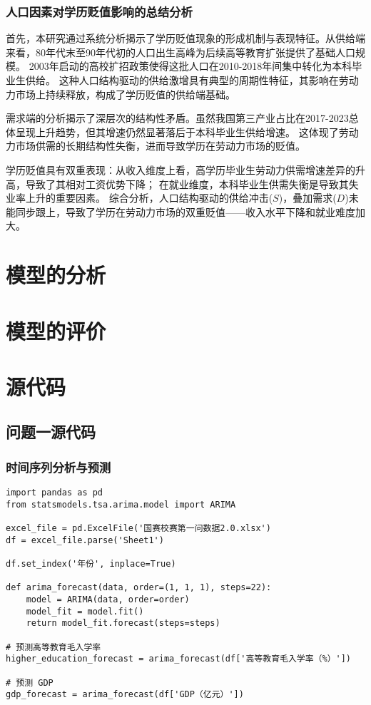 \documentclass[withoutpreface,bwprint]{cumcmthesis} %
\begin{document}
\subsubsection{人口因素对学历贬值影响的总结分析}

首先，本研究通过系统分析揭示了学历贬值现象的形成机制与表现特征。从供给端来看，80年代末至90年代初的人口出生高峰为后续高等教育扩张提供了基础人口规模。
2003年启动的高校扩招政策使得这批人口在2010-2018年间集中转化为本科毕业生供给。
这种人口结构驱动的供给激增具有典型的周期性特征，其影响在劳动力市场上持续释放，构成了学历贬值的供给端基础。

需求端的分析揭示了深层次的结构性矛盾。虽然我国第三产业占比在2017-2023总体呈现上升趋势，但其增速仍然显著落后于本科毕业生供给增速。
这体现了劳动力市场供需的长期结构性失衡，进而导致学历在劳动力市场的贬值。

学历贬值具有双重表现：从收入维度上看，高学历毕业生劳动力供需增速差异的升高，导致了其相对工资优势下降；
在就业维度，本科毕业生供需失衡是导致其失业率上升的重要因素。
综合分析，人口结构驱动的供给冲击($S$)，叠加需求($D$)未能同步跟上，导致了学历在劳动力市场的双重贬值——收入水平下降和就业难度加大。

\section{模型的分析}

\section{模型的评价}




\newpage
\appendix
\section{源代码}

\subsection{问题一源代码}

\subsubsection{时间序列分析与预测}

\begin{verbatim}
import pandas as pd
from statsmodels.tsa.arima.model import ARIMA

excel_file = pd.ExcelFile('国赛校赛第一问数据2.0.xlsx')
df = excel_file.parse('Sheet1')

df.set_index('年份', inplace=True)

def arima_forecast(data, order=(1, 1, 1), steps=22):
    model = ARIMA(data, order=order)
    model_fit = model.fit()
    return model_fit.forecast(steps=steps)

# 预测高等教育毛入学率
higher_education_forecast = arima_forecast(df['高等教育毛入学率（%）'])

# 预测 GDP
gdp_forecast = arima_forecast(df['GDP（亿元）'])
\end{verbatim}
\end{document}
